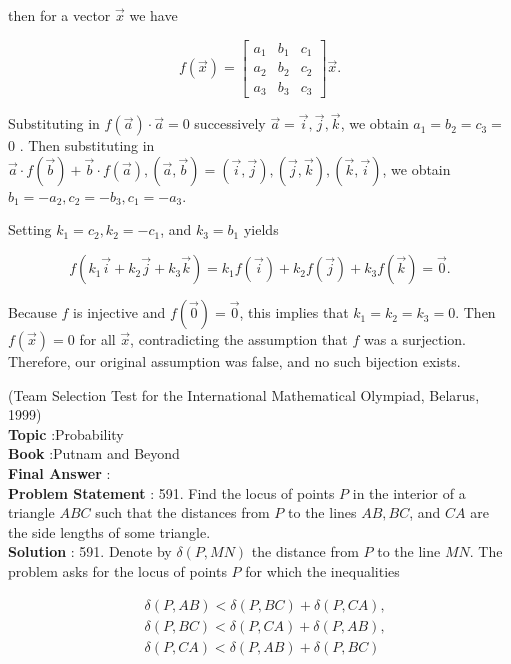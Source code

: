 \documentclass[10pt]{article}
\begin{document}
then for a vector $\vec{x}$ we have

$$
f(\vec{x})=\left[\begin{array}{lll}
a_{1} & b_{1} & c_{1} \\
a_{2} & b_{2} & c_{2} \\
a_{3} & b_{3} & c_{3}
\end{array}\right] \vec{x} .
$$

Substituting in $f(\vec{a}) \cdot \vec{a}=0$ successively $\vec{a}=\vec{i}, \vec{j}, \vec{k}$, we obtain $a_{1}=b_{2}=c_{3}=$ 0 . Then substituting in $\vec{a} \cdot f(\vec{b})+\vec{b} \cdot f(\vec{a}),(\vec{a}, \vec{b})=(\vec{i}, \vec{j}),(\vec{j}, \vec{k}),(\vec{k}, \vec{i})$, we obtain $b_{1}=-a_{2}, c_{2}=-b_{3}, c_{1}=-a_{3}$.

Setting $k_{1}=c_{2}, k_{2}=-c_{1}$, and $k_{3}=b_{1}$ yields

$$
f\left(k_{1} \vec{i}+k_{2} \vec{j}+k_{3} \vec{k}\right)=k_{1} f(\vec{i})+k_{2} f(\vec{j})+k_{3} f(\vec{k})=\overrightarrow{0} .
$$

Because $f$ is injective and $f(\overrightarrow{0})=\overrightarrow{0}$, this implies that $k_{1}=k_{2}=k_{3}=0$. Then $f(\vec{x})=0$ for all $\vec{x}$, contradicting the assumption that $f$ was a surjection. Therefore, our original assumption was false, and no such bijection exists.

(Team Selection Test for the International Mathematical Olympiad, Belarus, 1999)
\\
\textbf{Topic} :Probability\\
\textbf{Book} :Putnam and Beyond\\
\textbf{Final Answer} :\\


\textbf{Problem Statement} :
591. Find the locus of points $P$ in the interior of a triangle $A B C$ such that the distances from $P$ to the lines $A B, B C$, and $C A$ are the side lengths of some triangle.
\\
\textbf{Solution} :
591. Denote by $\delta(P, M N)$ the distance from $P$ to the line $M N$. The problem asks for the locus of points $P$ for which the inequalities

$$
\begin{aligned}
&\delta(P, A B)<\delta(P, B C)+\delta(P, C A), \\
&\delta(P, B C)<\delta(P, C A)+\delta(P, A B), \\
&\delta(P, C A)<\delta(P, A B)+\delta(P, B C)
\end{aligned}
$$
\end{document}
